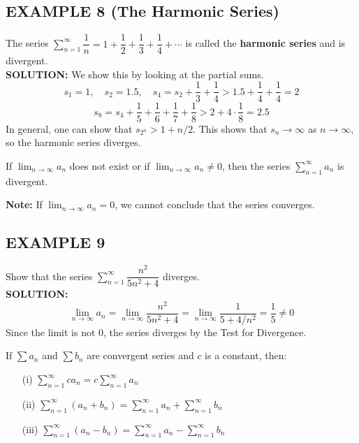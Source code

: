 \documentclass{article}
\begin{document}
\subsection*{EXAMPLE 8 (The Harmonic Series)}
The series \( \sum_{n=1}^{\infty} \dfrac{1}{n} = 1 + \dfrac{1}{2} + \dfrac{1}{3} + \dfrac{1}{4} + \cdots \) is called the \textbf{harmonic series} and is divergent.\\
\textbf{SOLUTION:}
We show this by looking at the partial sums.
\[ s_1 = 1, \quad s_2 = 1.5, \quad s_4 = s_2 + \dfrac{1}{3} + \dfrac{1}{4} > 1.5 + \dfrac{1}{4} + \dfrac{1}{4} = 2 \]
\[ s_8 = s_4 + \dfrac{1}{5} + \dfrac{1}{6} + \dfrac{1}{7} + \dfrac{1}{8} > 2 + 4 \cdot \dfrac{1}{8} = 2.5 \]
In general, one can show that \(s_{2^n} > 1 + n/2\). This shows that \(s_n \to \infty\) as \(n \to \infty\), so the harmonic series diverges.

\begin{tcolorbox}[
    colback=white,
    colframe=orange!80!white,
    title=Theorem: Test for Divergence,
    boxrule=0.5mm,
    arc=3mm
    ]
    If \( \lim_{n\to\infty} a_n \) does not exist or if \( \lim_{n\to\infty} a_n \neq 0 \), then the series \( \sum_{n=1}^{\infty} a_n \) is divergent.
\end{tcolorbox}
\textbf{Note:} If \( \lim_{n\to\infty} a_n = 0 \), we cannot conclude that the series converges.

\subsection*{EXAMPLE 9}
Show that the series \( \sum_{n=1}^{\infty} \dfrac{n^2}{5n^2+4} \) diverges.\\
\textbf{SOLUTION:}
\[ \lim_{n\to\infty} a_n = \lim_{n\to\infty} \dfrac{n^2}{5n^2+4} = \lim_{n\to\infty} \dfrac{1}{5+4/n^2} = \dfrac{1}{5} \neq 0 \]
Since the limit is not 0, the series diverges by the Test for Divergence.

\begin{tcolorbox}[
    colback=white,
    colframe=orange!80!white,
    title=Properties of Convergent Series,
    boxrule=0.5mm,
    arc=3mm
    ]
    If \( \sum a_n \) and \( \sum b_n \) are convergent series and \(c\) is a constant, then:
    \begin{itemize}
        \item[(i)] \( \sum_{n=1}^{\infty} c a_n = c \sum_{n=1}^{\infty} a_n \)
        \item[(ii)] \( \sum_{n=1}^{\infty} (a_n + b_n) = \sum_{n=1}^{\infty} a_n + \sum_{n=1}^{\infty} b_n \)
        \item[(iii)] \( \sum_{n=1}^{\infty} (a_n - b_n) = \sum_{n=1}^{\infty} a_n - \sum_{n=1}^{\infty} b_n \)
    \end{itemize}
\end{tcolorbox}
\end{document}
